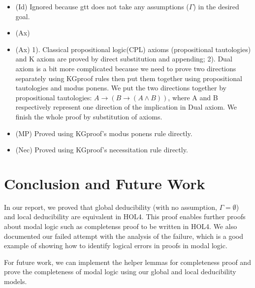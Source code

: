 \documentclass[submission,copyright,creativecommons]{eptcs}
\begin{document}
\begin{itemize}
 \item (Id) Ignored because gtt does not take any assumptions ($\Gamma$) in the desired goal. \item (Ax)
 \item (Ax) 1). Classical propositional logic(CPL) axioms (propositional tautologies) and K axiom are proved by 
 direct substitution and appending; 2). Dual axiom is a bit more complicated because we need to prove 
 two directions separately using KGproof rules then put them together using propositional tautologies and 
 modus ponens. We put the two directions together by propositional tautologies:
 $A\rightarrow (B \rightarrow (A \wedge B))$, where A and B respectively represent 
 one direction of the implication in Dual axiom. We finish the whole proof by substitution of axioms. 
 \item (MP) Proved using KGproof's modus ponens rule directly.
 \item (Nec) Proved using KGproof's necessitation rule directly.
\end{itemize}


\section{Conclusion and Future Work}
In our report, we proved that global deducibility (with no assumption, $\Gamma = \emptyset$) 
and local deducibility are equivalent in HOL4. 
This proof enables further proofs about modal logic such as completenss proof 
to be written in HOL4. 
We also documented our failed attempt with the analysis of the failure, which 
is a good example of showing how to identify logical errors in proofs in modal logic. 

For future work, we can implement the helper lemmas for completeness proof 
and prove the completeness of modal logic using our global and local deducibility 
models. 




\end{document}
